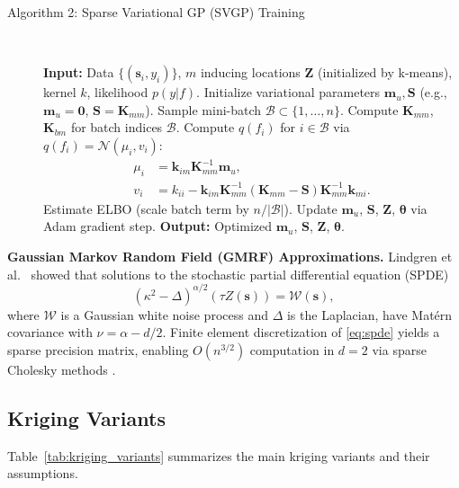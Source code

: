 \documentclass[conference]{IEEEtran}
\begin{document}
\begin{description}
\item[Algorithm 2: Sparse Variational GP (SVGP) Training]~
\begin{algorithmic}[1]
\STATE \textbf{Input:} Data $\{(\mathbf{s}_i, y_i)\}$, $m$ inducing locations $\mathbf{Z}$ (initialized by k-means), kernel $k$, likelihood $p(y|f)$.
\STATE Initialize variational parameters $\mathbf{m}_u, \mathbf{S}$ (e.g., $\mathbf{m}_u = \mathbf{0}$, $\mathbf{S} = \mathbf{K}_{mm}$).
\REPEAT
  \STATE Sample mini-batch $\mathcal{B} \subset \{1,\ldots,n\}$.
  \STATE Compute $\mathbf{K}_{mm}$, $\mathbf{K}_{bm}$ for batch indices $\mathcal{B}$.
  \STATE Compute $q(f_i)$ for $i \in \mathcal{B}$ via $q(f_i) = \mathcal{N}(\mu_i, v_i)$:
      \begin{align*}
        \mu_i &= \mathbf{k}_{im}\mathbf{K}_{mm}^{-1}\mathbf{m}_u, \\
        v_i &= k_{ii} - \mathbf{k}_{im}\mathbf{K}_{mm}^{-1}(\mathbf{K}_{mm}-\mathbf{S})\mathbf{K}_{mm}^{-1}\mathbf{k}_{mi}.
      \end{align*}
  \STATE Estimate ELBO (scale batch term by $n/|\mathcal{B}|$).
  \STATE Update $\mathbf{m}_u$, $\mathbf{S}$, $\mathbf{Z}$, $\bm{\theta}$ via Adam gradient step.
\STATE \textbf{Output:} Optimized $\mathbf{m}_u$, $\mathbf{S}$, $\mathbf{Z}$, $\bm{\theta}$.
\end{algorithmic}
\end{description}

\textbf{Gaussian Markov Random Field (GMRF) Approximations.} Lindgren et al.\ \cite{lindgren2011explicit} showed that solutions to the stochastic partial differential equation (SPDE)
\begin{equation}
  (\kappa^2 - \Delta)^{\alpha/2}(\tau Z(\mathbf{s})) = \mathcal{W}(\mathbf{s}),
  \label{eq:spde}
\end{equation}
where $\mathcal{W}$ is a Gaussian white noise process and $\Delta$ is the Laplacian, have Mat\'{e}rn covariance with $\nu = \alpha - d/2$. Finite element discretization of \eqref{eq:spde} yields a sparse precision matrix, enabling $O(n^{3/2})$ computation in $d=2$ via sparse Cholesky methods \cite{rue2005gaussian}.

\subsection{Kriging Variants}

Table~\ref{tab:kriging_variants} summarizes the main kriging variants and their assumptions.
\end{document}
